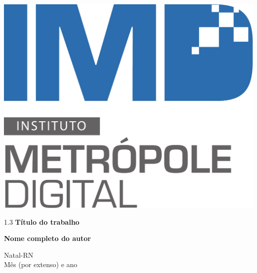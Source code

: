 \begin{titlingpage}
\begin{center}
\begin{minipage}{2.2cm}
\begin{center}
				\includegraphics[scale=0.1]{Imagens/Logotipo-IMD}
			\end{center}
		\end{minipage}
			
		\vspace{6cm}
						
		{\setlength{\baselineskip}%
		{1.3\baselineskip}
		{\LARGE \textbf{Título do trabalho}}\par}
			
		\vspace{3cm}
			
		{\large \textbf{Nome completo do autor}}
						
		\vspace{6cm}
		
		Natal-RN\\Mês (por extenso) e ano
	\end{center}
\end{titlingpage}